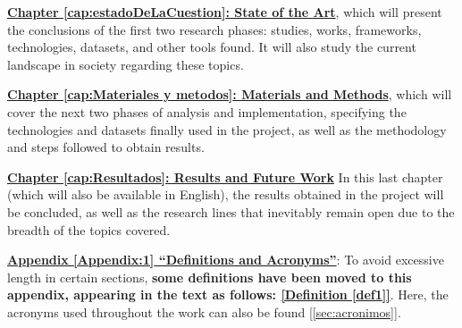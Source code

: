 \hyperref[cap:estadoDeLaCuestion]{\textbf{Chapter \ref*{cap:estadoDeLaCuestion}: State of the Art}}, which will present the conclusions of the first two research phases: studies, works, frameworks, technologies, datasets, and other tools found. It will also study the current landscape in society regarding these topics.

\hyperref[cap:Materiales y metodos]{\textbf{Chapter \ref*{cap:Materiales y metodos}: Materials and Methods}}, which will cover the next two phases of analysis and implementation, specifying the technologies and datasets finally used in the project, as well as the methodology and steps followed to obtain results.


\hyperref[cap:Resultados]{\textbf{Chapter \ref*{cap:Resultados}: Results and Future Work}} In this last chapter (which will also be available in English), the results obtained in the project will be concluded, as well as the research lines that inevitably remain open due to the breadth of the topics covered.

\hyperref[Appendix:1]{\textbf{Appendix \ref*{Appendix:1} ``Definitions and Acronyms''}}: To avoid excessive length in certain sections, \textbf{some definitions have been moved to this appendix, appearing in the text as follows: \hyperref[def1]{[Definition \ref*{def1}]}}. Here, the acronyms used throughout the work can also be found [\ref{sec:acronimos}].

